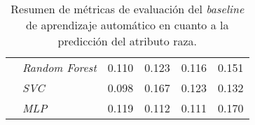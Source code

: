 \begin{table}[htpb]
{\begin{tabular}{llcccc}
                                            & \emph{Random Forest}        & 0.110 & 0.123 & 0.116 & 0.151\\
        \cmidrule{2-6}
                                            & \emph{SVC}                  & 0.098 & 0.167 & 0.123 & 0.132\\
        \cmidrule{2-6}
                                            & \emph{MLP}                  & 0.119 & 0.112 & 0.111 & 0.170\\
        \bottomrule
        \end{tabular}}
    \caption{Resumen de m\'etricas de evaluaci\'on del \emph{baseline} de aprendizaje autom\'atico en cuanto a la predicci\'on del atributo raza.}
    \label{table:eval_baseline1_race}
\end{table}

\begin{table}[htpb]
    \centering
    \caption{Resumen de m\'etricas de evaluaci\'on del \emph{baseline} humano en cuanto a la predicci\'on del atributo g\'enero.}
    \label{table:eval_baseline2_gender}
\end{table}

\begin{table}[htpb]
    \centering
    \caption{Resumen de m\'etricas de evaluaci\'on del \emph{baseline} humano en cuanto a la predicci\'on del atributo raza.}
    \label{table:eval_baseline2_race}
\end{table}


